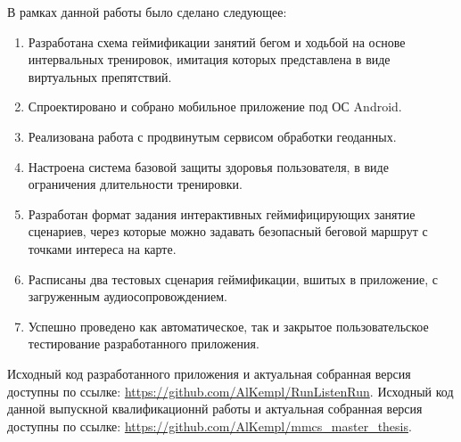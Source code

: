 \Conc
В рамках данной работы было сделано следующее:
\begin{enumerate}
	\item Разработана схема геймификации занятий бегом и ходьбой на основе интервальных тренировок, имитация которых представлена в виде виртуальных препятствий.
	\item Спроектировано и собрано мобильное приложение под ОС Android.
	\item Реализована работа с продвинутым сервисом обработки геоданных.
	\item Настроена система базовой защиты здоровья пользователя, в виде ограничения длительности тренировки.
	\item Разработан формат задания интерактивных геймифицирующих занятие сценариев, через которые можно задавать безопасный беговой маршрут с точками интереса на карте.
	\item Расписаны два тестовых сценария геймификации, вшитых в приложение, с загруженным аудиосопровождением.
	\item Успешно проведено как автоматическое, так и закрытое пользовательское тестирование разработанного приложения.
\end{enumerate} 
\medskip
Исходный код разработанного приложения и актуальная собранная версия доступны по ссылке: \url{https://github.com/AlKempl/RunListenRun}.
\medskip
Исходный код данной выпускной квалификационнй работы и актуальная собранная версия доступны по ссылке: \url{https://github.com/AlKempl/mmcs_master_thesis}.


